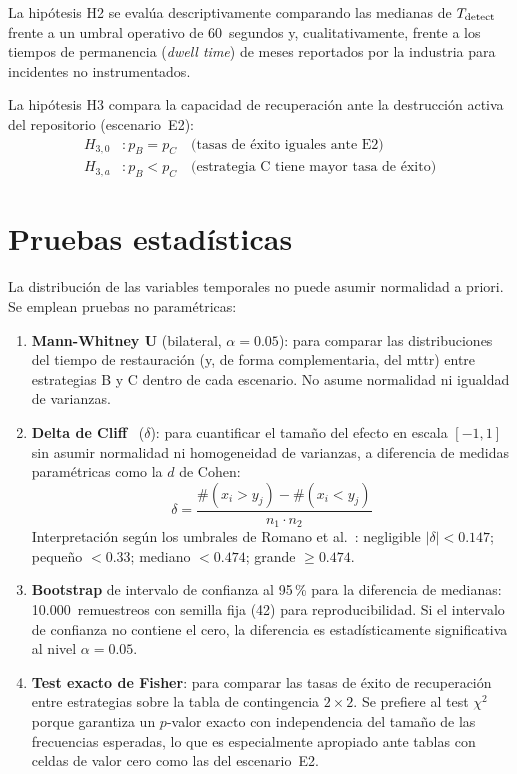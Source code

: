 \documentclass[../main.tex]{subfiles}
\begin{document}
La hipótesis H2 se evalúa descriptivamente comparando las medianas de $T_{\text{detect}}$
frente a un umbral operativo de 60~segundos y, cualitativamente, frente a los
tiempos de permanencia (\emph{dwell time}) de meses reportados por la industria
para incidentes no instrumentados.

La hipótesis H3 compara la capacidad de recuperación ante la destrucción activa
del repositorio (escenario~E2):
\begin{align}
  H_{3,0} &: p_B = p_C \quad \text{(tasas de éxito iguales ante E2)} \\
  H_{3,a} &: p_B < p_C \quad \text{(estrategia C tiene mayor tasa de éxito)}
\end{align}

\section{Pruebas estadísticas}

La distribución de las variables temporales no puede asumir normalidad a priori.
Se emplean pruebas no paramétricas:

\begin{enumerate}
  \item \textbf{Mann-Whitney U} (bilateral, $\alpha = 0.05$): para comparar las
  distribuciones del tiempo de restauración (y, de forma complementaria, del
  \gls{mttr}) entre estrategias B y C dentro de cada escenario. No asume
  normalidad ni igualdad de varianzas.

  \item \textbf{Delta de Cliff}~\cite{cliff1993} ($\delta$): para cuantificar el
  tamaño del efecto en escala $[-1, 1]$ sin asumir normalidad ni homogeneidad de
  varianzas, a diferencia de medidas paramétricas como la $d$ de Cohen:
  \begin{equation}
    \delta = \frac{\#(x_i > y_j) - \#(x_i < y_j)}{n_1 \cdot n_2}
  \end{equation}
  Interpretación según los umbrales de Romano et al.~\cite{romano2006}:
  negligible $|\delta| < 0.147$; pequeño $< 0.33$; mediano $< 0.474$; grande
  $\geq 0.474$.

  \item \textbf{Bootstrap} de intervalo de confianza al 95\,\% para la diferencia
  de medianas: 10.000~remuestreos con semilla fija (42) para reproducibilidad.
  Si el intervalo de confianza no contiene el cero, la diferencia es
  estadísticamente significativa al nivel $\alpha = 0.05$.

  \item \textbf{Test exacto de Fisher}: para comparar las tasas de éxito de
  recuperación entre estrategias sobre la tabla de contingencia $2\times 2$.
  Se prefiere al test $\chi^2$ porque garantiza un $p$-valor exacto con
  independencia del tamaño de las frecuencias esperadas, lo que es especialmente
  apropiado ante tablas con celdas de valor cero como las del escenario~E2.
\end{enumerate}
\end{document}
